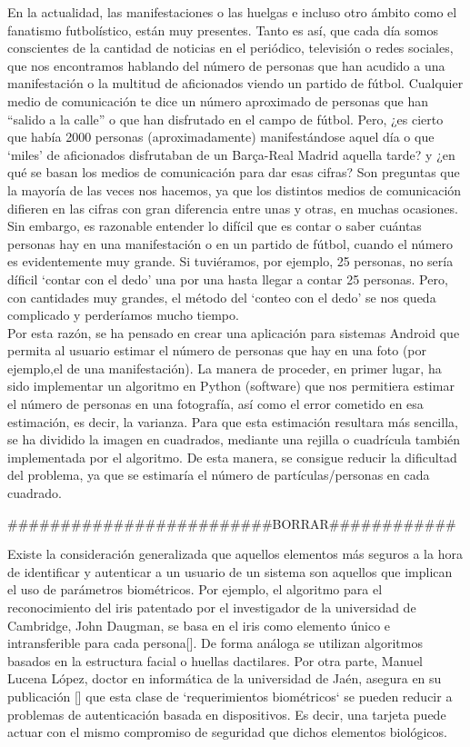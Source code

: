 \documentclass[PFC.tex]{subfiles}
\begin{document}
En la actualidad, las manifestaciones o las huelgas e incluso otro ámbito como el fanatismo futbolístico, están muy presentes. Tanto es así, que cada día somos conscientes de la cantidad de noticias en el periódico, televisión o redes sociales, que nos encontramos hablando del número de personas que han acudido a una manifestación o la multitud de aficionados viendo un partido de fútbol. Cualquier medio de comunicación te dice un número aproximado de personas que han “salido a la calle” o que han disfrutado en el campo de fútbol. Pero, ¿es cierto que había 2000 personas (aproximadamente) manifestándose aquel día o que ‘miles’ de aficionados disfrutaban de un Barça-Real Madrid aquella tarde? y ¿en qué se basan los medios de comunicación para dar esas cifras? Son preguntas que la mayoría de las veces nos hacemos, ya que los distintos medios de comunicación difieren en las cifras con gran diferencia entre unas y otras, en muchas ocasiones.\\

Sin embargo, es razonable entender lo difícil que es contar o saber cuántas personas hay en una manifestación o en un partido de fútbol, cuando el número es evidentemente muy grande. Si tuviéramos, por ejemplo, 25 personas, no sería díficil ‘contar con el dedo’ una por una hasta llegar a contar 25 personas. Pero, con cantidades muy grandes, el método del ‘conteo con el dedo’ se nos queda complicado y perderíamos mucho tiempo.\\

Por esta razón, se ha pensado en crear una aplicación para sistemas Android que permita al usuario estimar el número de personas que hay en una foto (por ejemplo,el de una manifestación). La manera de proceder, en primer lugar, ha sido implementar un algoritmo en Python (software) que nos permitiera estimar el número de personas en una fotografía, así como el error cometido en esa estimación, es decir, la varianza. Para que esta estimación resultara más sencilla, se ha dividido la imagen en cuadrados, mediante una rejilla o cuadrícula también implementada por el algoritmo. De esta manera, se consigue reducir la dificultad del problema, ya que se estimaría el número de partículas/personas en cada cuadrado.


#########################BORRAR############



Existe la consideración generalizada que aquellos elementos más seguros a la hora de identificar y autenticar a un usuario de un sistema son aquellos que implican el uso de parámetros biométricos. Por ejemplo, el algoritmo para el reconocimiento del iris patentado por el investigador de la universidad de Cambridge, John Daugman, se basa en el iris como elemento único e intransferible para cada persona[\cite{irisramli}]. De forma análoga se utilizan algoritmos basados en la estructura facial o huellas dactilares. Por otra parte, Manuel Lucena López, doctor en informática de la universidad de Jaén, asegura en su publicación [\cite{lucena}] que esta clase de `requerimientos biométricos` se pueden reducir a problemas de autenticación basada en dispositivos. Es decir, una tarjeta puede actuar con el mismo compromiso de seguridad que dichos elementos biológicos.\\
\end{document}
